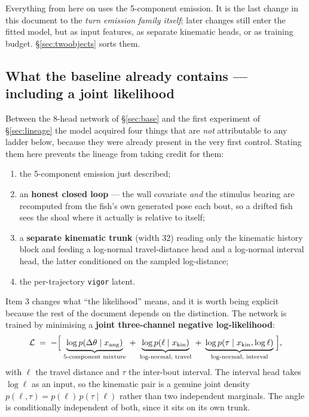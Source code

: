 \documentclass[11pt,a4paper]{article}
\newcommand{\dth}{\ensuremath{\Delta\theta}}
\newcommand{\code}[1]{\texttt{\small #1}}
\begin{document}
\begin{takeaway}
Everything from here on uses the 5-component emission. It is the last change in this
document to the \emph{turn emission family itself}; later changes still enter the fitted
model, but as input features, as separate kinematic heads, or as training budget.
\S\ref{sec:twoobjects} sorts them.
\end{takeaway}

\subsection{What the baseline already contains --- including a joint
            likelihood}\label{sec:joint}

Between the 8-head network of \S\ref{sec:base} and the first experiment of
\S\ref{sec:lineage} the model acquired four things that are \emph{not} attributable to any
ladder below, because they were already present in the very first control. Stating them
here prevents the lineage from taking credit for them:

\begin{enumerate}\itemsep2pt
\item the 5-component emission just described;
\item an \textbf{honest closed loop} --- the wall covariate \emph{and} the stimulus bearing
      are recomputed from the fish's own generated pose each bout, so a drifted fish sees
      the shoal where it actually is relative to itself;
\item a \textbf{separate kinematic trunk} (width 32) reading only the kinematic history
      block and feeding a log-normal travel-distance head and a log-normal interval head,
      the latter conditioned on the sampled log-distance;
\item the per-trajectory \code{vigor} latent.
\end{enumerate}

Item 3 changes what ``the likelihood'' means, and it is worth being explicit because the
rest of the document depends on the distinction. The network is trained by minimising a
\textbf{joint three-channel negative log-likelihood}:
\begin{equation}\label{eq:joint}
\mathcal{L} \;=\; -\Bigl[\;
  \underbrace{\log p(\dth \mid x_{\mathrm{ang}})}_{\text{5-component mixture}}
  \;+\; \underbrace{\log p(\ell \mid x_{\mathrm{kin}})}_{\text{log-normal, travel}}
  \;+\; \underbrace{\log p(\tau \mid x_{\mathrm{kin}}, \log \ell)}_{\text{log-normal, interval}}
\;\Bigr],
\end{equation}
with $\ell$ the travel distance and $\tau$ the inter-bout interval. The interval head takes
$\log \ell$ as an input, so the kinematic pair is a genuine joint density
$p(\ell,\tau) = p(\ell)\,p(\tau \mid \ell)$ rather than two independent marginals. The
angle is conditionally independent of both, since it sits on its own trunk.
\end{document}
